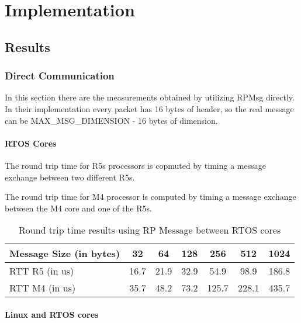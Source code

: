 

\chapter{Implementation}

\section{Results}

\subsection{Direct Communication}

In this section there are the measurements obtained by utilizing RPMsg
directly.
In their implementation every packet has 16 bytes of header, so the real
message can be MAX\_MSG\_DIMENSION - 16 bytes of dimension.

\subsubsection{RTOS Cores}

The round trip time for R5s processors is copmuted by timing a message exchange
between two different R5s.

The round trip time for M4 processor is computed by timing a message exchange
between the M4 core and one of the R5s.

\begin{table}
\centering
\caption{Round trip time results using RP Message between RTOS cores}
\label{table:direct_communication_RTOS_cores}
\begin{tabular}{lcccccc}
\toprule
Message Size (in bytes) & 32 & 64 & 128 & 256 & 512 & 1024 \\
\midrule
RTT R5 (in us) & 16.7 & 21.9 & 32.9 & 54.9 & 98.9 & 186.8 \\
RTT M4 (in us) & 35.7 & 48.2 & 73.2 & 125.7 & 228.1 & 435.7 \\
\bottomrule
\end{tabular}
\end{table}

\subsubsection{Linux and RTOS cores}

